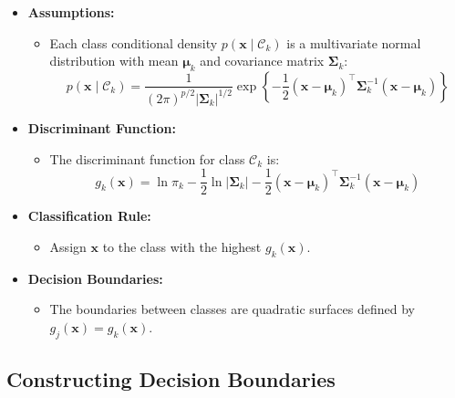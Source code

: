 \documentclass{article}
\begin{document}
\begin{itemize}
    \item \textbf{Assumptions:}
    \begin{itemize}
        \item Each class conditional density $p(\mathbf{x} \mid \mathcal{C}_k)$ is a multivariate normal distribution with mean $\boldsymbol{\mu}_k$ and covariance matrix $\boldsymbol{\Sigma}_k$:
        \[
        p(\mathbf{x} \mid \mathcal{C}_k) = \frac{1}{(2\pi)^{p/2} |\boldsymbol{\Sigma}_k|^{1/2}} \exp\left\{ -\frac{1}{2} (\mathbf{x} - \boldsymbol{\mu}_k)^\top \boldsymbol{\Sigma}_k^{-1} (\mathbf{x} - \boldsymbol{\mu}_k) \right\}
        \]
    \end{itemize}
    \item \textbf{Discriminant Function:}
    \begin{itemize}
        \item The discriminant function for class $\mathcal{C}_k$ is:
        \[
        g_k(\mathbf{x}) = \ln \pi_k - \frac{1}{2} \ln |\boldsymbol{\Sigma}_k| - \frac{1}{2} (\mathbf{x} - \boldsymbol{\mu}_k)^\top \boldsymbol{\Sigma}_k^{-1} (\mathbf{x} - \boldsymbol{\mu}_k)
        \]
    \end{itemize}
    \item \textbf{Classification Rule:}
    \begin{itemize}
        \item Assign $\mathbf{x}$ to the class with the highest $g_k(\mathbf{x})$.
    \end{itemize}
    \item \textbf{Decision Boundaries:}
    \begin{itemize}
        \item The boundaries between classes are quadratic surfaces defined by $g_j(\mathbf{x}) = g_k(\mathbf{x})$.
    \end{itemize}
\end{itemize}

\subsection{Constructing Decision Boundaries}
\end{document}
